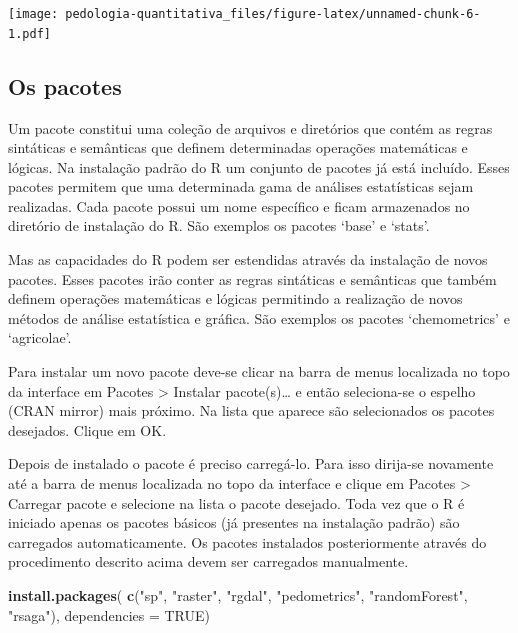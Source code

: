 \documentclass[]{book}
\newenvironment{Shaded}{\begin{snugshade}}{\end{snugshade}}
\newcommand{\KeywordTok}[1]{\textcolor[rgb]{0.13,0.29,0.53}{\textbf{{#1}}}}
\newcommand{\DataTypeTok}[1]{\textcolor[rgb]{0.13,0.29,0.53}{{#1}}}
\newcommand{\StringTok}[1]{\textcolor[rgb]{0.31,0.60,0.02}{{#1}}}
\newcommand{\OtherTok}[1]{\textcolor[rgb]{0.56,0.35,0.01}{{#1}}}
\newcommand{\NormalTok}[1]{{#1}}
\begin{document}
\texttt{[image: pedologia-quantitativa\_files/figure-latex/unnamed-chunk-6-1.pdf]}

\subsection{Os pacotes}\label{os-pacotes}

Um pacote constitui uma coleção de arquivos e diretórios que contém as
regras sintáticas e semânticas que definem determinadas operações
matemáticas e lógicas. Na instalação padrão do R um conjunto de pacotes
já está incluído. Esses pacotes permitem que uma determinada gama de
análises estatísticas sejam realizadas. Cada pacote possui um nome
específico e ficam armazenados no diretório de instalação do R. São
exemplos os pacotes `base' e `stats'.

Mas as capacidades do R podem ser estendidas através da instalação de
novos pacotes. Esses pacotes irão conter as regras sintáticas e
semânticas que também definem operações matemáticas e lógicas permitindo
a realização de novos métodos de análise estatística e gráfica. São
exemplos os pacotes `chemometrics' e `agricolae'.

Para instalar um novo pacote deve-se clicar na barra de menus localizada
no topo da interface em Pacotes \textgreater{} Instalar
pacote(s)\ldots{} e então seleciona-se o espelho (CRAN mirror) mais
próximo. Na lista que aparece são selecionados os pacotes desejados.
Clique em OK.

Depois de instalado o pacote é preciso carregá-lo. Para isso dirija-se
novamente até a barra de menus localizada no topo da interface e clique
em Pacotes \textgreater{} Carregar pacote e selecione na lista o pacote
desejado. Toda vez que o R é iniciado apenas os pacotes básicos (já
presentes na instalação padrão) são carregados automaticamente. Os
pacotes instalados posteriormente através do procedimento descrito acima
devem ser carregados manualmente.

\begin{Shaded}
\begin{Highlighting}[]
\KeywordTok{install.packages}\NormalTok{(}
  \KeywordTok{c}\NormalTok{(}\StringTok{"sp"}\NormalTok{, }\StringTok{"raster"}\NormalTok{, }\StringTok{"rgdal"}\NormalTok{, }\StringTok{"pedometrics"}\NormalTok{, }\StringTok{"randomForest"}\NormalTok{, }\StringTok{"rsaga"}\NormalTok{), }\DataTypeTok{dependencies =} \OtherTok{TRUE}\NormalTok{)}
\end{Highlighting}
\end{Shaded}
\end{document}
